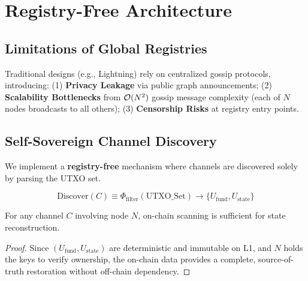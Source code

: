 \section{Registry-Free Architecture}

\subsection{Limitations of Global Registries}

Traditional designs (e.g., Lightning) rely on centralized gossip protocols, introducing:
(1) \textbf{Privacy Leakage} via public graph announcements;
(2) \textbf{Scalability Bottlenecks} from $\mathcal{O}(N^2)$ gossip message complexity (each of $N$ nodes broadcasts to all others);
(3) \textbf{Censorship Risks} at registry entry points.

\subsection{Self-Sovereign Channel Discovery}

We implement a \textbf{registry-free} mechanism where channels are discovered solely by parsing the UTXO set.
\begin{definition}
$$ \text{Discover}(C) \equiv \Phi_{\mathrm{filter}}(\text{UTXO\_Set}) \to \{U_{\mathrm{fund}}, U_{\mathrm{state}}\} $$
\end{definition}

\begin{theorem}
For any channel $C$ involving node $N$, on-chain scanning is sufficient for state reconstruction.
\end{theorem}
\begin{proof}
Since $(U_{\mathrm{fund}}, U_{\mathrm{state}})$ are deterministic and immutable on L1, and $N$ holds the keys to verify ownership, the on-chain data provides a complete, source-of-truth restoration without off-chain dependency.
\end{proof}

